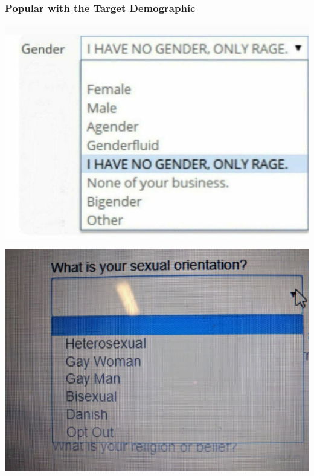 \documentclass[aspectratio=169,x11names]{beamer}
\begin{document}
\begin{frame}
\frametitle{Popular with the Target Demographic}
\begin{center}
\includegraphics[height=0.725\textheight,keepaspectratio]{images/gender_RAGE.jpg} 
\end{center}
\end{frame}

\begin{frame}
\begin{center}
\includegraphics[height=0.8\textheight,keepaspectratio]{images/theashencouncil_01.png} 
\end{center}
\end{frame}

\end{document}
